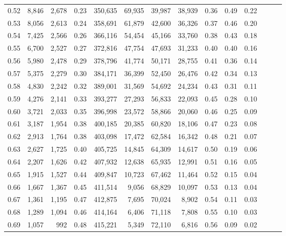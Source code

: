 \begin{tabular}{rrrrrrrrrrrrrr}
0.52 &   8,846 &  2,678 &  0.23 &  350,635 &   69,935 &  39,987 &  38,939 &  0.36 &  0.49 &      0.22 \\
0.53 &   8,056 &  2,613 &  0.24 &  358,691 &   61,879 &  42,600 &  36,326 &  0.37 &  0.46 &      0.20 \\
0.54 &   7,425 &  2,566 &  0.26 &  366,116 &   54,454 &  45,166 &  33,760 &  0.38 &  0.43 &      0.18 \\
0.55 &   6,700 &  2,527 &  0.27 &  372,816 &   47,754 &  47,693 &  31,233 &  0.40 &  0.40 &      0.16 \\
0.56 &   5,980 &  2,478 &  0.29 &  378,796 &   41,774 &  50,171 &  28,755 &  0.41 &  0.36 &      0.14 \\
0.57 &   5,375 &  2,279 &  0.30 &  384,171 &   36,399 &  52,450 &  26,476 &  0.42 &  0.34 &      0.13 \\
0.58 &   4,830 &  2,242 &  0.32 &  389,001 &   31,569 &  54,692 &  24,234 &  0.43 &  0.31 &      0.11 \\
0.59 &   4,276 &  2,141 &  0.33 &  393,277 &   27,293 &  56,833 &  22,093 &  0.45 &  0.28 &      0.10 \\
0.60 &   3,721 &  2,033 &  0.35 &  396,998 &   23,572 &  58,866 &  20,060 &  0.46 &  0.25 &      0.09 \\
0.61 &   3,187 &  1,954 &  0.38 &  400,185 &   20,385 &  60,820 &  18,106 &  0.47 &  0.23 &      0.08 \\
0.62 &   2,913 &  1,764 &  0.38 &  403,098 &   17,472 &  62,584 &  16,342 &  0.48 &  0.21 &      0.07 \\
0.63 &   2,627 &  1,725 &  0.40 &  405,725 &   14,845 &  64,309 &  14,617 &  0.50 &  0.19 &      0.06 \\
0.64 &   2,207 &  1,626 &  0.42 &  407,932 &   12,638 &  65,935 &  12,991 &  0.51 &  0.16 &      0.05 \\
0.65 &   1,915 &  1,527 &  0.44 &  409,847 &   10,723 &  67,462 &  11,464 &  0.52 &  0.15 &      0.04 \\
0.66 &   1,667 &  1,367 &  0.45 &  411,514 &    9,056 &  68,829 &  10,097 &  0.53 &  0.13 &      0.04 \\
0.67 &   1,361 &  1,195 &  0.47 &  412,875 &    7,695 &  70,024 &   8,902 &  0.54 &  0.11 &      0.03 \\
0.68 &   1,289 &  1,094 &  0.46 &  414,164 &    6,406 &  71,118 &   7,808 &  0.55 &  0.10 &      0.03 \\
0.69 &   1,057 &    992 &  0.48 &  415,221 &    5,349 &  72,110 &   6,816 &  0.56 &  0.09 &      0.02 \\

\end{tabular}
